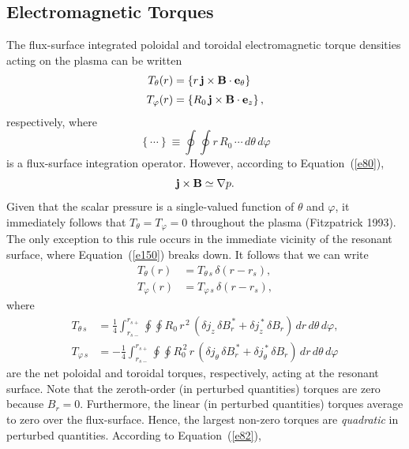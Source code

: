 \documentclass[notitlepage,12pt]{article}
\begin{document}
\subsection{Electromagnetic Torques}\label{storque}
The flux-surface integrated poloidal and toroidal electromagnetic torque densities acting on the plasma
can be written
\begin{align}\label{e152}
T_\theta(r) &= \left\{ r\,{\bf j}\times {\bf B}\cdot {\bf e}_\theta\right\}\\[0.5ex]
T_\varphi(r) &= \left\{ R_0\,{\bf j}\times {\bf B}\cdot {\bf e}_z\right\},
\end{align}
respectively, 
where
\begin{equation}
\left\{\cdots\right\} \equiv \oint\oint r\,R_0\,\cdots\,d\theta\,d\varphi
\end{equation}
is a flux-surface integration  operator. 
 However, according to Equation~(\ref{e80}),
\begin{equation}\label{e150}
{\bf j}\times {\bf B} \simeq \nabla p.
\end{equation}
Given that the scalar pressure is a single-valued function of $\theta$ and $\varphi$, it immediately follows
that $T_\theta=T_\varphi = 0$ throughout the plasma (Fitzpatrick 1993). The only exception to this rule occurs in the immediate vicinity of the
resonant surface, where Equation~(\ref{e150}) breaks down. It follows that we can write
\begin{align}\label{e156a}
T_\theta(r) &= T_{\theta\,s}\,\delta(r-r_s),\\[0.5ex]
T_\varphi(r) &= T_{\varphi\,s}\,\delta(r-r_s),
\end{align}
where
\begin{align}\label{e153}
T_{\theta\,s} &=  \frac{1}{4}\int_{r_{s-}}^{r_{s+}}\oint\oint R_0\,r^{\,2}\,(\delta j_z\,\delta B_r^{\,\ast} + \delta j_z^{\,\ast}\,\delta B_r)\,dr\,d\theta\,d\varphi,\\[0.5ex]
T_{\varphi\,s} &=  -\frac{1}{4}\int_{r_{s-}}^{r_{s+}}\oint\oint R_0^{\,2}\,r\,(\delta j_\theta\,\delta B_r^{\,\ast} + \delta j_\theta^{\,\ast}\,\delta B_r)\,dr\,d\theta\,d\varphi
\end{align}
are the net poloidal and toroidal torques, respectively, acting at the resonant surface. 
Note that the zeroth-order (in perturbed quantities) torques are zero because $B_r=0$. Furthermore, the linear (in perturbed quantities) torques 
average to zero over the flux-surface. Hence, the largest non-zero torques  are {\em quadratic}\/ in perturbed quantities. 
According to Equation~(\ref{e82}), 
\end{document}
